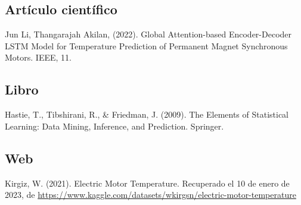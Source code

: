 \documentclass{article}
\begin{document}
\subsection{Artículo científico}

 Jun Li, Thangarajah Akilan, (2022). Global Attention-based Encoder-Decoder LSTM Model for Temperature Prediction of Permanent Magnet Synchronous Motors. IEEE, 11.

\subsection{Libro}

 Hastie, T., Tibshirani, R., & Friedman, J. (2009). The Elements of Statistical Learning: Data Mining, Inference, and Prediction. Springer.

\subsection{Web}
Kirgiz, W. (2021). Electric Motor Temperature. Recuperado el 10 de enero de 2023, de \url{https://www.kaggle.com/datasets/wkirgsn/electric-motor-temperature}
\end{document}
